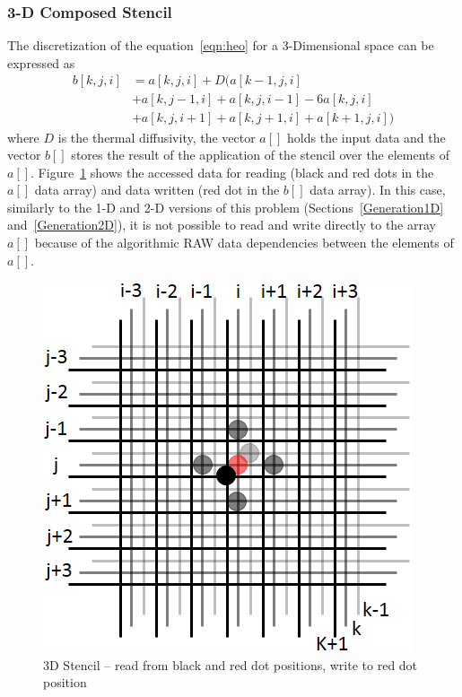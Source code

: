 \documentclass{acm_proc_article-sp}
\begin{document}
\subsubsection{3-D Composed Stencil}
The discretization of the equation~\eqref{eqn:heo} for a 3-Dimensional space can be expressed as
\begin{equation}
  \begin{split}
    b[k,j,i] &= a[k,j,i] + D(a[k-1,j,i]\\
    &+ a[k,j-1,i] + a[k,j,i-1] - 6a[k,j,i]\\
    &+ a[k,j,i+1] + a[k,j+1,i] + a[k+1,j,i])
  \end{split}
  \label{eqn:hed-3d}
\end{equation}
where $D$ is the thermal diffusivity, the vector $a[]$ holds the input data and the vector $b[]$ stores the result of the application of the stencil over the elements of $a[]$. Figure~\ref{pic:3d-s01} shows the accessed data for reading (black and red dots in the $a[]$ data array) and data written (red dot in the $b[]$ data array).
In this case, similarly to the 1-D and 2-D versions of this problem (Sections~\ref{Generation1D} and~\ref{Generation2D}), it is not possible to read and write directly to the array $a[]$ because of the algorithmic RAW data dependencies between the elements of $a[]$.
\begin{figure}[ht!]
  \centering
  \includegraphics[scale=0.5]{pics/stencil_grid/3d-s01}
  \caption{3D Stencil -- read from black and red dot positions, write to red dot position}
  \label{pic:3d-s01}
\end{figure}
\end{document}
